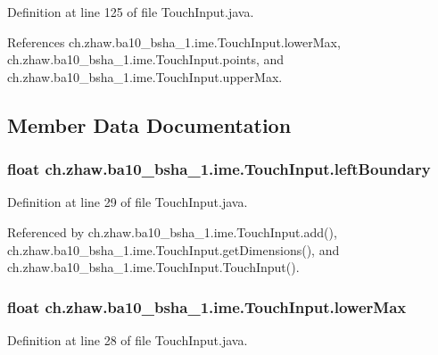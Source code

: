 Definition at line 125 of file TouchInput.java.

References ch.zhaw.ba10\_\-bsha\_\-1.ime.TouchInput.lowerMax, ch.zhaw.ba10\_\-bsha\_\-1.ime.TouchInput.points, and ch.zhaw.ba10\_\-bsha\_\-1.ime.TouchInput.upperMax.

\subsection{Member Data Documentation}
\hypertarget{classch_1_1zhaw_1_1ba10__bsha__1_1_1ime_1_1TouchInput_aaaec1a7c1eb29dde413a37e18fe9eaac}{
\subsubsection[{leftBoundary}]{\setlength{\rightskip}{0pt plus 5cm}float {\bf ch.zhaw.ba10\_\-bsha\_\-1.ime.TouchInput.leftBoundary}}}
\label{classch_1_1zhaw_1_1ba10__bsha__1_1_1ime_1_1TouchInput_aaaec1a7c1eb29dde413a37e18fe9eaac}


Definition at line 29 of file TouchInput.java.

Referenced by ch.zhaw.ba10\_\-bsha\_\-1.ime.TouchInput.add(), ch.zhaw.ba10\_\-bsha\_\-1.ime.TouchInput.getDimensions(), and ch.zhaw.ba10\_\-bsha\_\-1.ime.TouchInput.TouchInput().\hypertarget{classch_1_1zhaw_1_1ba10__bsha__1_1_1ime_1_1TouchInput_aaab22f154cdbb07626714d84b808a68a}{
\subsubsection[{lowerMax}]{\setlength{\rightskip}{0pt plus 5cm}float {\bf ch.zhaw.ba10\_\-bsha\_\-1.ime.TouchInput.lowerMax}}}
\label{classch_1_1zhaw_1_1ba10__bsha__1_1_1ime_1_1TouchInput_aaab22f154cdbb07626714d84b808a68a}


Definition at line 28 of file TouchInput.java.

